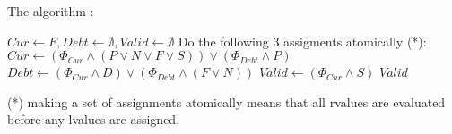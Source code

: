 \documentclass{article}
\begin{document}
The algorithm :
\begin{algorithmic}
    \State $Cur\leftarrow F, Debt\leftarrow\emptyset, Valid\leftarrow\emptyset$
    \For{$\_\in[n]$}
        \State Do the following 3 assigments atomically (*):
        \State $
            Cur\leftarrow
                \left(\Phi_{Cur}\wedge(P\vee N\vee F\vee S)\right)
                \vee
                \left(\Phi_{Debt}\wedge P\right)
        $
        \State $
            Debt\leftarrow
                \left(\Phi_{Cur}\wedge D\right)
                \vee
                \left(\Phi_{Debt}\wedge (F\vee N)\right)
        $
        \State $
            Valid\leftarrow
                \left(\Phi_{Cur}\wedge S\right)
        $
    \EndFor
    \State \Return $Valid$
\end{algorithmic}
(*) making a set of assignments atomically
means that all rvalues are evaluated before any
lvalues are assigned.\\
\end{document}
